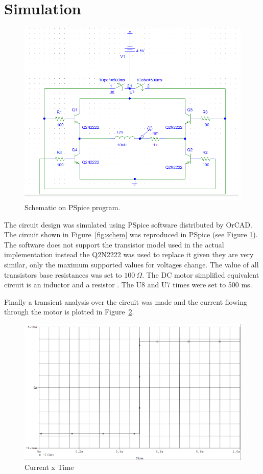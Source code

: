 \section{\textbf{Simulation}}\label{sec:3}

\begin{figure}[t]
    \includegraphics[height=.5\textwidth]{img/schem_pspice.png}
    \caption{Schematic on PSpice program.}\label{fig:schem_pspice}%
\end{figure}

    The circuit design was simulated using PSpice software distributed by OrCAD. The circuit shown in Figure~\ref{fig:schem} was reproduced in PSpice (see Figure \ref{fig:schem_pspice}). The software does not support the transistor model used in the actual implementation  instead the Q2N2222 was used to replace it given they are very similar, only the maximum supported values for voltages change. The value of all transistors base resistances was set to $100\:\Omega$. The DC motor simplified equivalent circuit is an inductor and a resistor . The U8 and U7 times were set to 500 ms.

	Finally a transient analysis over the circuit was made and the current flowing through the motor is plotted in Figure~\ref{fig:plot_ponteh}.
	
	
\begin{figure}
\centering
\includegraphics[height=.5\textwidth]{img/plot.png}
\caption{Current x Time} \label{fig:plot_ponteh}
\end{figure}	
